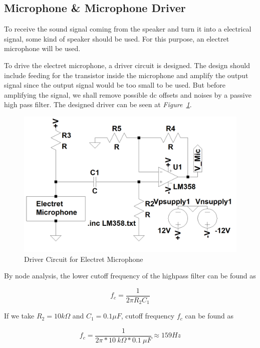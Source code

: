 \documentclass[paper]{IEEEtran}
\begin{document}
\subsection{Microphone \& Microphone Driver}
	To receive the sound signal coming from the speaker and turn it into a electrical signal, some kind of speaker should be used. For this purpose, an electret microphone will be used. 
	
	To drive the electret microphone, a driver circuit is designed. The design should include feeding for the transistor inside the microphone and amplify the output signal since the output signal would be too small to be used. But before amplifying the signal, we shall remove possible dc offsets and noises by a passive high pass filter. The designed driver can be seen at \textit{Figure~\ref{fig:micdr}}.

\begin{figure}[h!]
\setlength{\unitlength}{\textwidth}
\center 
\includegraphics[width=0.45\unitlength]{mic_v2.png}
\caption{\label{fig:micdr}Driver Circuit for Electret Microphone }
\end{figure}	


By node analysis, the lower cutoff frequency of the highpass filter can be found as

$$ f_{c} =\frac{1}{2\pi R_{2}C_{1}} $$

If we take $R_{2}=10k\Omega$ and $C_{1}=0.1\mu F$, cutoff frequency $f_c$ can be found as

$$ f_{c} =\frac{1}{2\pi*10~k\Omega*0.1~\mu F}\approx 159 Hz $$
\end{document}
